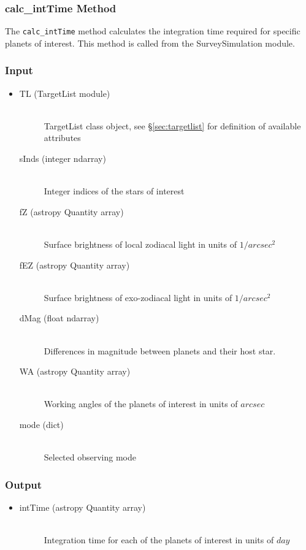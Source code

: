 \documentclass[cleanfoot]{asme2ej}
\begin{document}
\subsubsection{calc\_intTime Method} \label{sec:calcintTimetask}
The \verb+calc_intTime+ method calculates the integration time required for specific planets of interest.  This method is called from the SurveySimulation module.

\subsubsection*{Input}
\begin{itemize}
\item 
\begin{description}
    \item[TL (TargetList module)] \hfill \\ TargetList class object, see \S\ref{sec:targetlist} for definition of available attributes
    \item[sInds (integer ndarray)] \hfill \\ Integer indices of the stars of interest
    \item[fZ (astropy Quantity array)] \hfill \\ Surface brightness of local zodiacal light in units of $ 1/arcsec^2 $
    \item[fEZ (astropy Quantity array)] \hfill \\ Surface brightness of exo-zodiacal light in units of $ 1/arcsec^2 $
    \item[dMag (float ndarray)] \hfill \\ Differences in magnitude between planets and their host star.
    \item[WA (astropy Quantity array)] \hfill \\ Working angles of the planets of interest in units of $ arcsec $
    \item[mode (dict)] \hfill \\ Selected observing mode
\end{description}
\end{itemize}

\subsubsection*{Output}
\begin{itemize}
\item 
\begin{description}
    \item[intTime (astropy Quantity array)] \hfill \\ Integration time for each of the planets of interest in units of $ day $
\end{description}
\end{itemize}
\end{document}
